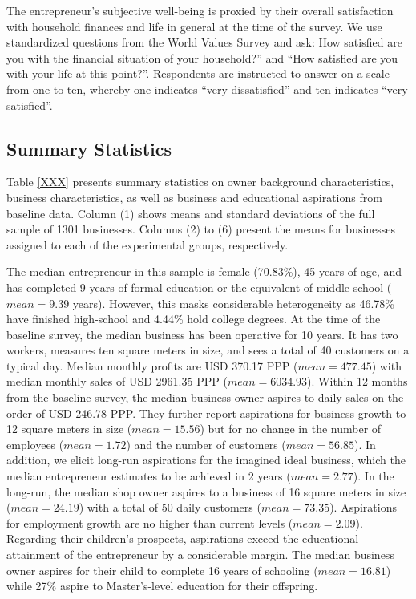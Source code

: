 \documentclass[11.5pt]{article}
\begin{document}
{The entrepreneur's subjective well-being is proxied by their overall satisfaction with household finances and life in general at the time of the survey. We use standardized questions from the World Values Survey and ask: How satisfied are you with the financial situation of your household?'' and ``How satisfied are you with your life at this point?''. Respondents are instructed to answer on a scale from one to ten, whereby one indicates ``very dissatisfied'' and ten indicates ``very satisfied''.


\subsection{Summary Statistics}

Table \ref{XXX} presents summary statistics on owner background characteristics, business characteristics, as well as business and educational aspirations from baseline data. Column (1) shows means and standard deviations of the full sample of 1301 businesses. Columns (2) to (6) present the means for businesses assigned to each of the experimental groups, respectively.

The median entrepreneur in this sample is female (70.83\%), 45 years of age, and has completed 9 years of formal education or the equivalent of middle school ($mean = 9.39$ years). However, this masks considerable heterogeneity as 46.78\% have finished high-school and 4.44\% hold college degrees. At the time of the baseline survey, the median business has been operative for 10 years. It has two workers, measures ten square meters in size, and sees a total of 40 customers on a typical day. Median monthly profits are USD 370.17 PPP ($mean = 477.45$) with median monthly sales of USD 2961.35 PPP ($mean = 6034.93$). Within 12 months from the baseline survey, the median business owner aspires to daily sales on the order of USD 246.78 PPP. They further report aspirations for business growth to 12 square meters in size ($mean = 15.56$) but for no change in the number of employees ($mean = 1.72$) and the number of customers ($mean = 56.85$). In addition, we elicit long-run aspirations for the imagined ideal business, which the median entrepreneur estimates to be achieved in 2 years ($mean = 2.77$). In the long-run, the median shop owner aspires to a business of 16 square meters in size ($mean = 24.19$) with a total of 50 daily customers ($mean = 73.35$). Aspirations for employment growth are no higher than current levels ($mean = 2.09$). Regarding their children's prospects, aspirations exceed the educational attainment of the entrepreneur by a considerable margin. The median business owner aspires for their child to complete 16 years of schooling ($mean = 16.81$) while 27\% aspire to Master's-level education for their offspring. %

}
\end{document}

